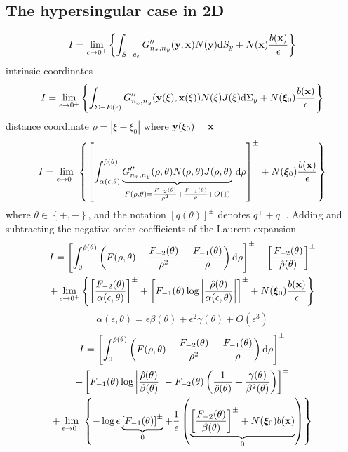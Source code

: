 \documentclass[a4paper,11pt]{article}
\newcommand{\td}{\mathrm{d}}
\begin{document}
\subsection{The hypersingular case in 2D}

\begin{equation}
I =
\lim_{\epsilon \to 0^+}
\left\{
\int_{S-e_{\epsilon}}
G''_{n_x,n_y}({\bf y}, {\bf x}) N({\bf y})
\td S_y
+
N({\bf x})
\frac{b({\bf x})}{\epsilon}
\right\}
\end{equation}
%
intrinsic coordinates
%
\begin{equation}
I =
\lim_{\epsilon \to 0^+}
\left\{
\int_{\Sigma-E(\epsilon)}
G''_{n_x,n_y}({\bf y}(\xi), {\bf x}(\xi)) N(\xi) J(\xi)
\td \Sigma_y
+
N(\bm{\xi}_0)
\frac{b({\bf x})}{\epsilon}
\right\}
\end{equation}
%
distance coordinate $\rho = |\xi-\xi_0|$ where ${\bf y}(\xi_0) = {\bf x}$
%
\begin{equation}
I =
\lim_{\epsilon \to 0^+}
\left\{
\left[
\int_{\alpha(\epsilon, \theta)}^{\hat{\rho}(\theta)}
\underbrace{G''_{n_x,n_y}(\rho,\theta) N(\rho,\theta) J(\rho,\theta)}_{
	F(\rho,\theta) = \frac{F_{-2}(\theta)}{\rho^2} + \frac{F_{-1}(\theta)}{\rho} + O(1)
} \,
\td \rho
\right]^{\pm}
+
N(\bm{\xi}_0)
\frac{b({\bf x})}{\epsilon}
\right\}
\end{equation}
%
%
where $\theta \in \left\{ +, -\right\}$, and the notation $\left[q(\theta)\right]^{\pm}$ denotes $q^+ + q^-$.
Adding and subtracting the negative order coefficients of the Laurent expansion
%
\begin{multline}
I =
\left[
\int_{0}^{\hat{\rho}(\theta)}
\left(
	F(\rho,\theta) - \frac{F_{-2}(\theta)}{\rho^2} - \frac{F_{-1}(\theta)}{\rho}
\right)
\td \rho
\right]^{\pm}
-
\left[
	\frac{F_{-2}(\theta)}{\hat{\rho}(\theta)}
\right]^{\pm}
\\
+
\lim_{\epsilon \to 0^+}
\left\{
\left[
	\frac{F_{-2}(\theta)}{\alpha(\epsilon, \theta)}
\right]^{\pm}
+
\left[
F_{-1}(\theta) \log\left|
	\frac{\hat{\rho}(\theta)}{\alpha(\epsilon, \theta)}
	\right|
\right]^{\pm}
+
N(\bm{\xi}_0)
\frac{b({\bf x})}{\epsilon}
\right\}
\end{multline}
%
\begin{equation}
\alpha(\epsilon,\theta) = \epsilon \beta(\theta) + \epsilon^2 \gamma(\theta) + O(\epsilon^3)
\end{equation}
%
\begin{multline}
I =
\left[
\int_{0}^{\hat{\rho}(\theta)}
\left(
	F(\rho,\theta) - \frac{F_{-2}(\theta)}{\rho^2} - \frac{F_{-1}(\theta)}{\rho}
\right)
\td \rho
\right]^{\pm}
\\
+
\left[
F_{-1}(\theta) \log\left|
	\frac{\hat{\rho}(\theta)}{\beta(\theta)}
	\right|
-
	F_{-2}(\theta)
	\left(
	\frac{1}{\hat{\rho}(\theta)}
	+\frac{\gamma(\theta)}{\beta^2(\theta)}
	\right)
\right]^{\pm}
\\
+
\lim_{\epsilon \to 0^+}
\left\{
-
\log\epsilon
\underbrace{
\left[
F_{-1}(\theta)
\right]^{\pm}
}_{0}
+
\frac{1}{\epsilon}
\left(
\underbrace{
\left[
	\frac{F_{-2}(\theta)}{\beta(\theta)}
\right]^{\pm}
+
N(\bm{\xi}_0)
b({\bf x})
}_{0}
\right)
\right\}
\end{multline}
\end{document}
